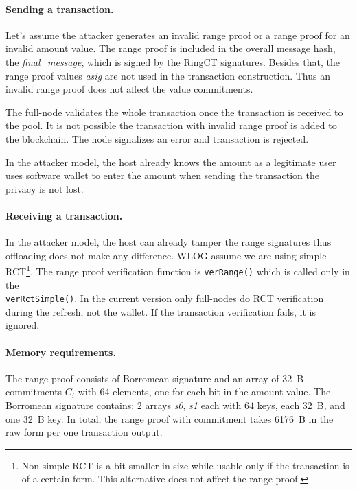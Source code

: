 \documentclass[]{article}
\begin{document}
\paragraph{Sending a transaction.}
Let's assume the attacker generates an invalid range proof or a range proof for an invalid amount value. The range proof is included in the overall message hash, the \emph{final\_message}, which is signed by the RingCT signatures. Besides that, the range proof values \emph{asig} are not used in the transaction construction. Thus an invalid range proof does not affect the value commitments. 

The full-node validates the whole transaction once the transaction is received to the pool. It is not possible the transaction with invalid range proof is added to the blockchain. The node signalizes an error and transaction is rejected.

In the attacker model, the host already knows the amount as a legitimate user uses software wallet to enter the amount when sending the transaction the privacy is not lost.

\paragraph{Receiving a transaction.}
In the attacker model, the host can already tamper the range signatures thus offloading does not make any difference.
WLOG assume we are using simple RCT\footnote{Non-simple RCT is a bit smaller in size while usable only if the transaction is of a certain form. This alternative does not affect the range proof.}. The range proof verification function is \verb|verRange()| which is called only in the \\\verb|verRctSimple()|. In the current version only full-nodes do RCT verification during the refresh, not the wallet. If the transaction verification fails, it is ignored.

\paragraph{Memory requirements.} 
The range proof consists of Borromean signature and an array of 32~B commitments $C_i$ with 64 elements, one for each bit in the amount value. The Borromean signature contains: $2$ arrays \emph{s0}, \emph{s1} each with $64$ keys, each 32~B, and one 32~B key. In total, the range proof with commitment takes 6176~B in the raw form per one transaction output.
\end{document}
